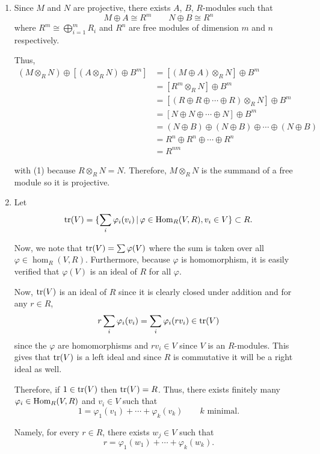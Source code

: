 \documentclass[12pt]{Qual}
\begin{document}
\begin{solution}$\,$
\begin{enumerate}[label=(\alph*)]
    \item Since $M$ and $N$ are projective, there exists $A$, $B$, $R$-modules such that $$M\oplus A\cong R^m\qquad N\oplus B\cong R^n$$ where $R^m\cong\bigoplus_{i=1}^mR_i$ and $R^n$ are free modules of dimension $m$ and $n$ respectively.

    Thus,  \begin{align*}
        (M\otimes_RN)\oplus[(A\otimes_R N)\oplus B^m]&=[(M\oplus A)\otimes_RN]\oplus B^m\\
        &=[R^m\otimes_RN]\oplus B^m\\
        &=[(R\oplus R\oplus\cdots\oplus R)\otimes_R N]\oplus B^m\\
        &=[N\oplus N\oplus \cdots\oplus N]\oplus B^m\tag{1}\\
        &=(N\oplus B)\oplus (N\oplus B)\oplus \cdots \oplus (N\oplus B)\\
        &=R^n\oplus R^n\oplus\cdots\oplus R^n\\
        &=R^{nm}
    \end{align*}

    with (1) because $R\otimes_R N=N.$ Therefore, $M\otimes_R N$ is the summand of a free module so it is projective.

    \item Let $$\text{tr}(V)=\{\sum_i\varphi_i(v_i)\,|\,\varphi\in\text{Hom}_R(V,R),v_i\in V\}\subset R.$$

    Now, we note that $\text{tr}(V)=\sum\varphi(V)$ where the sum is taken over all $\varphi\in\hom_R(V,R)$. Furthermore, because $\varphi$ is homomorphism, it is easily verified that $\varphi(V)$ is an ideal of $R$ for all $\varphi$.

    Now, $\text{tr}(V)$ is an ideal of $R$ since it is clearly closed under addition and for any $r\in R$, $$r\sum_i\varphi_i(v_i)=\sum_i\varphi_i(rv_i)\in\text{tr}(V)$$ since the $\varphi$ are homomorphisms and $rv_i\in V$ since $V$ is an $R$-modules. This gives that $\text{tr}(V)$ is a left ideal and since $R$ is commutative it will be a right ideal as well.

    Therefore, if $1\in\text{tr}(V)$ then $\text{tr}(V)=R$. Thus, there exists finitely many $\varphi_i\in\text{Hom}_R(V,R)$ and $v_i\in V$ such that $$1=\varphi_1(v_1)+\cdots+\varphi_k(v_k)\qquad k\text{ minimal}.$$

    Namely, for every $r\in R$, there exists $w_j\in V$ such that $$r=\varphi_1(w_1)+\cdots+\varphi_k(w_k).$$


\end{enumerate}
\end{solution}
\end{document}
